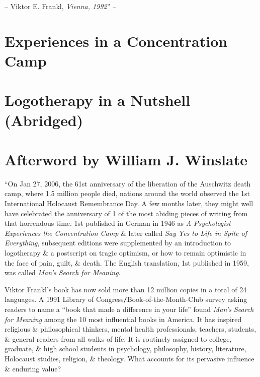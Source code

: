 \documentclass{article}
\numberwithin{equation}{section}
\begin{document}
-- Viktor E. Frankl, \textit{Vienna, 1992}'' -- \cite[pp. 10--11]{Frankl2017}


\section{Experiences in a Concentration Camp}


\section{Logotherapy in a Nutshell (Abridged)}


\section{Afterword by William J. Winslate}
``On Jan 27, 2006, the 61st anniversary of the liberation of the Auschwitz death camp, where 1.5 million people died, nations around the world observed the 1st International Holocaust Remembrance Day. A few months later, they might well have celebrated the anniversary of 1 of the most abiding pieces of writing from that horrendous time. 1st published in German in 1946 as \textit{A Psychologist Experiences the Concentration Camp} \& later called \textit{Say Yes to Life in Spite of Everything}, subsequent editions were supplemented by an introduction to logotherapy \& a postscript on tragic optimism, or how to remain optimistic in the face of pain, guilt, \& death. The English translation, 1st published in 1959, was called \textit{Man's Search for Meaning}.

Viktor Frankl's book has now sold more than 12 million copies in a total of 24 languages. A 1991 Library of Congress\texttt{/}Book-of-the-Month-Club survey asking readers to name a ``book that made a difference in your life'' found \textit{Man's Search for Meaning} among the 10 most influential books in America. It has inspired religious \& philosophical thinkers, mental health professionals, teachers, students, \& general readers from all walks of life. It is routinely assigned to college, graduate, \& high school students in psychology, philosophy, history, literature, Holocaust studies, religion, \& theology. What accounts for its pervasive influence \& enduring value?
\end{document}
